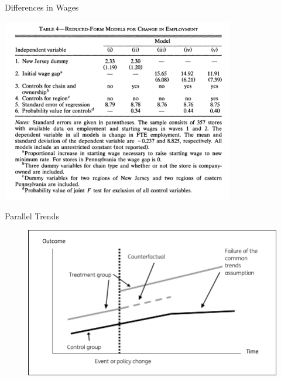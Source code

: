 \begin{frame}{Differences in Wages}
\begin{center}
\includegraphics[width=4in]{./resources/ck_tab4.png}
\end{center}
\end{frame}


\begin{frame}{Parallel Trends}
\begin{figure}
\centering
\includegraphics[width=5in]{./resources/common_trend.png}
\end{figure}
\end{frame}



